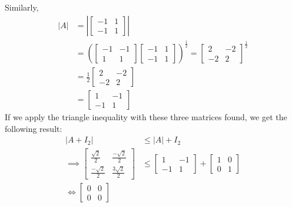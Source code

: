 \begin{example}
Similarly, 
\begin{align*}
    |A| &= \left|
    \begin{bmatrix}
        -1 & 1\\
        -1 & 1
    \end{bmatrix} \right|\\
    &=
    \left(
    \begin{bmatrix}
        -1 & -1\\
        1 & 1
    \end{bmatrix}
    \begin{bmatrix}
        -1 & 1\\
        -1 & 1
    \end{bmatrix}\right)^\frac{1}{2} 
    = 
    \begin{bmatrix}
        2 & -2 \\
        -2 & 2
    \end{bmatrix}^\frac{1}{2}\\
    &= 
    \frac{1}{2}
    \begin{bmatrix}
        2 & -2\\
        -2 & 2
    \end{bmatrix}\\
    &=
    \begin{bmatrix}
        1 & -1\\
        -1 & 1
    \end{bmatrix}
\end{align*}
If we apply the triangle inequality with these three matrices found, we get the following result:
\begin{align*}
    |A+I_2| &\leq |A| +I_2 \\
    \implies\begin{bmatrix}
        \frac{\sqrt{2}}{2} & \frac{-\sqrt{2}}{2} \\
        \frac{-\sqrt{2}}{2} & \frac{3\sqrt{2}}{2}
    \end{bmatrix}
    &\leq
    \begin{bmatrix}
        1 & -1 \\
        -1 & 1
    \end{bmatrix}
    +
    \begin{bmatrix}
        1 & 0 \\
        0 & 1
    \end{bmatrix}\\
    \Leftrightarrow 
    \begin{bmatrix}
        0 & 0 \\
        0 & 0
    \end{bmatrix}

\end{align*}
\end{example}
